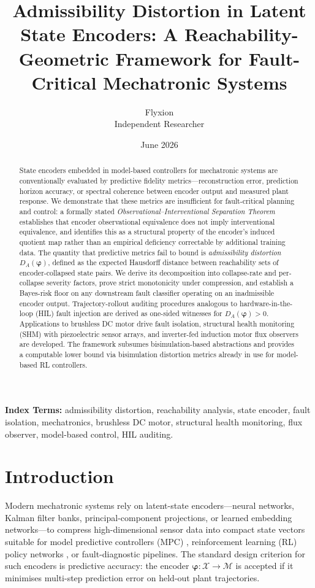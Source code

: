 \documentclass[10pt,twocolumn]{article}
\title{\textbf{Admissibility Distortion in Latent State Encoders:
A Reachability-Geometric Framework for Fault-Critical
Mechatronic Systems}}
\author{Flyxion\\
  {\small Independent Researcher}}
\date{June 2026}
\theoremstyle{plain}
\theoremstyle{definition}
\theoremstyle{remark}
\newcommand{\DA}{D_{A}(\bm{\varphi})}
\newcommand{\calX}{\mathcal{X}}
\newcommand{\calM}{\mathcal{M}}
\newcommand{\bvphi}{\bm{\varphi}}
\begin{document}
\maketitle
\thispagestyle{plain}

\begin{abstract}
\noindent
State encoders embedded in model-based controllers for mechatronic systems
are conventionally evaluated by predictive fidelity metrics---reconstruction
error, prediction horizon accuracy, or spectral coherence between encoder
output and measured plant response. We demonstrate that these metrics are
insufficient for fault-critical planning and control: a formally stated
\emph{Observational--Interventional Separation Theorem} establishes that
encoder observational equivalence does not imply interventional equivalence,
and identifies this as a structural property of the encoder's induced quotient
map rather than an empirical deficiency correctable by additional training data.
The quantity that predictive metrics fail to bound is \emph{admissibility
distortion} $\DA$, defined as the expected Hausdorff distance between
reachability sets of encoder-collapsed state pairs. We derive its decomposition
into collapse-rate and per-collapse severity factors, prove strict monotonicity
under compression, and establish a Bayes-risk floor on any downstream fault
classifier operating on an inadmissible encoder output. Trajectory-rollout
auditing procedures analogous to hardware-in-the-loop (HIL) fault injection
are derived as one-sided witnesses for $\DA > 0$. Applications to brushless
DC motor drive fault isolation, structural health monitoring (SHM) with
piezoelectric sensor arrays, and inverter-fed induction motor flux observers
are developed. The framework subsumes bisimulation-based abstractions and
provides a computable lower bound via bisimulation distortion metrics already
in use for model-based RL controllers.
\end{abstract}

\noindent\textbf{Index Terms:} admissibility distortion, reachability analysis,
state encoder, fault isolation, mechatronics, brushless DC motor, structural
health monitoring, flux observer, model-based control, HIL auditing.

\section{Introduction}

Modern mechatronic systems rely on latent-state encoders---neural networks,
Kalman filter banks, principal-component projections, or learned embedding
networks---to compress high-dimensional sensor data into compact state vectors
suitable for model predictive controllers (MPC) \citep{mayne2000model},
reinforcement learning (RL) policy networks \citep{bertsekas2012dynamic}, or
fault-diagnostic pipelines. The standard design criterion for such encoders
is predictive accuracy: the encoder $\bvphi: \calX \to \calM$ is accepted
if it minimises multi-step prediction error on held-out plant trajectories.
\end{document}
